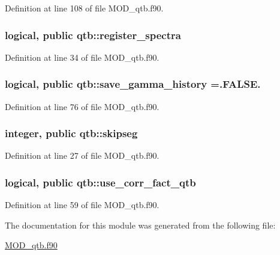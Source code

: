 Definition at line 108 of file M\-O\-D\-\_\-qtb.\-f90.

\hypertarget{classqtb_a872fe2905adbcf616ccc4c285220d0d2}{
\subsubsection[{register\-\_\-spectra}]{\setlength{\rightskip}{0pt plus 5cm}logical, public qtb\-::register\-\_\-spectra}}\label{classqtb_a872fe2905adbcf616ccc4c285220d0d2}


Definition at line 34 of file M\-O\-D\-\_\-qtb.\-f90.

\hypertarget{classqtb_a691e4a6864b758a6e2cba49e0dbf2088}{
\subsubsection[{save\-\_\-gamma\-\_\-history}]{\setlength{\rightskip}{0pt plus 5cm}logical, public qtb\-::save\-\_\-gamma\-\_\-history =.F\-A\-L\-S\-E.}}\label{classqtb_a691e4a6864b758a6e2cba49e0dbf2088}


Definition at line 76 of file M\-O\-D\-\_\-qtb.\-f90.

\hypertarget{classqtb_adc59c8806c7ede038b1845fc9f8147bb}{
\subsubsection[{skipseg}]{\setlength{\rightskip}{0pt plus 5cm}integer, public qtb\-::skipseg}}\label{classqtb_adc59c8806c7ede038b1845fc9f8147bb}


Definition at line 27 of file M\-O\-D\-\_\-qtb.\-f90.

\hypertarget{classqtb_adb33338a5d19000dc58db2e4829ae74b}{
\subsubsection[{use\-\_\-corr\-\_\-fact\-\_\-qtb}]{\setlength{\rightskip}{0pt plus 5cm}logical, public qtb\-::use\-\_\-corr\-\_\-fact\-\_\-qtb}}\label{classqtb_adb33338a5d19000dc58db2e4829ae74b}


Definition at line 59 of file M\-O\-D\-\_\-qtb.\-f90.



The documentation for this module was generated from the following file\-:\begin{DoxyCompactItemize}
\item 
\hyperlink{MOD__qtb_8f90}{M\-O\-D\-\_\-qtb.\-f90}\end{DoxyCompactItemize}
